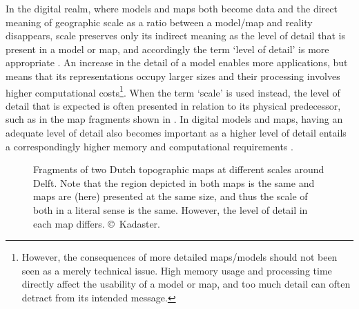 In the digital realm, where models and maps both become data and the direct meaning of geographic scale as a ratio between a model/map and reality disappears, scale preserves only its indirect meaning as the level of detail that is present in a model or map, and accordingly the term `level of detail' is more appropriate \citep{Biljecki14}.
An increase in the detail of a model enables more applications, but means that its representations occupy larger sizes and their processing involves higher computational costs\footnote{However, the consequences of more detailed maps/models should not been seen as a merely technical issue.
High memory usage and processing time directly affect the usability of a model or map, and too much detail can often detract from its intended message.}.
When the term `scale' is used instead, the level of detail that is expected is often presented in relation to its physical predecessor, such as in the map fragments shown in .
In digital models and maps, having an adequate level of detail also becomes important as a higher level of detail entails a correspondingly higher memory and computational requirements \citep{Luebke03}.
\begin{figure}[tbp]
\centering
{}
\quad
{}
\caption[Topographic maps at different scales around Delft]{Fragments of two Dutch topographic maps at different scales around Delft.
Note that the region depicted in both maps is the same and maps are (here) presented at the same size, and thus the scale of both in a literal sense is the same.
However, the level of detail in each map differs. \copyright\ Kadaster\protect\footnotemark.}
\label{fig:generalisation}
\end{figure}

